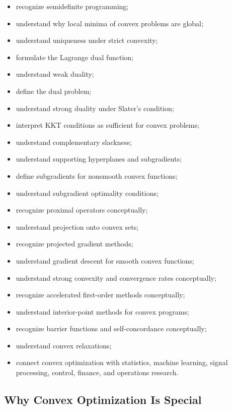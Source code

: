 {\begin{itemize}
    \item recognize semidefinite programming;
    \item understand why local minima of convex problems are global;
    \item understand uniqueness under strict convexity;
    \item formulate the Lagrange dual function;
    \item understand weak duality;
    \item define the dual problem;
    \item understand strong duality under Slater's condition;
    \item interpret KKT conditions as sufficient for convex problems;
    \item understand complementary slackness;
    \item understand supporting hyperplanes and subgradients;
    \item define subgradients for nonsmooth convex functions;
    \item understand subgradient optimality conditions;
    \item recognize proximal operators conceptually;
    \item understand projection onto convex sets;
    \item recognize projected gradient methods;
    \item understand gradient descent for smooth convex functions;
    \item understand strong convexity and convergence rates conceptually;
    \item recognize accelerated first-order methods conceptually;
    \item understand interior-point methods for convex programs;
    \item recognize barrier functions and self-concordance conceptually;
    \item understand convex relaxations;
    \item connect convex optimization with statistics, machine learning,
          signal processing, control, finance, and operations research.
\end{itemize}
}

\subsection{Why Convex Optimization Is Special}
\label{subsec:why-convex-optimization-special}

